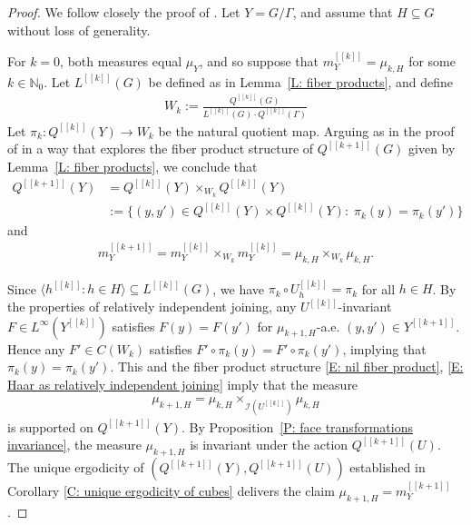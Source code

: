 \documentclass[11pt]{amsart}
\theoremstyle{definition}
\newcommand{\N}{{\mathbb N}}
\newcommand{\CI}{{\mathcal I}}
\newcommand{\cube}[1]{{[\![#1]\!]}}
\newcommand{\1}{{\mathbf{1}}}
\begin{document}
\begin{proof}
We follow closely the proof of \cite[Chapter 12, Proposition~7]{HK18}.
Let $Y=G/\Gamma$, and assume that $H\subseteq G$ without loss of generality.

    For $k=0$, both measures equal $\mu_Y$, and so suppose that $m_Y^\cube{k} = \mu_{k,H}$ for some $k\in\N_0$.
    Let $L^\cube{k}(G)$ be defined as in Lemma~\ref{L: fiber products}, and define
    \begin{align*}
        W_k := \frac{Q^\cube{k}(G)}{L^\cube{k}(G)\cdot Q^\cube{k}(\Gamma)}
    \end{align*}
        Let $\pi_k: Q^\cube{k}(Y)\to W_k$ be the natural quotient map. Arguing as in the proof of \cite[Chapter 12, Proposition~7]{HK18} in a way that explores the fiber product structure of $Q^\cube{k+1}(G)$ given by Lemma~\ref{L: fiber products}, we conclude that 
        \begin{align}\label{E: nil fiber product}
                    Q^\cube{k+1}(Y) &= Q^\cube{k}(Y)\times_{W_k}Q^\cube{k}(Y)\\
                    \nonumber
            &:=\{(y,y')\in Q^\cube{k}(Y)\times Q^\cube{k}(Y)\colon\; \pi_k(y)=\pi_k(y')\}
        \end{align}
        and
     \begin{align}\label{E: Haar as relatively independent joining}
        m^\cube{k+1}_Y = m^\cube{k}_Y \times_{W_k}m^\cube{k}_Y= \mu_{k,H} \times_{W_k}\mu_{k,H}.
    \end{align}


    Since $\langle h^{\cube{k}}\colon h\in H\rangle\subseteq L^\cube{k}(G)$, we have $\pi_k\circ U_h^{\cube{k}}=\pi_k$ for all $h\in H$. By the properties of relatively independent joining,
any $U^\cube{k}$-invariant $F\in L^\infty(Y^\cube{k})$ satisfies $F(y)=F(y')$ for $\mu_{k+1,H}$-a.e. $(y,y')\in Y^\cube{k+1}$. Hence any $F'\in C(W_k)$ satisfies $F'\circ \pi_k(y)=F'\circ\pi_k(y')$, implying that $\pi_k(y) = \pi_k(y')$. This and the fiber product structure \eqref{E: nil fiber product}, \eqref{E: Haar as relatively independent joining} imply that the measure
\begin{align*}
    \mu_{k+1,H} = \mu_{k,H}\times_{\CI(U^\cube{k})}\mu_{k,H}
\end{align*}
is supported on $Q^\cube{k+1}(Y)$. By Proposition~\ref{P: face transformations invariance}, the measure $\mu_{k+1,H}$ is invariant under the action $Q^\cube{k+1}(U)$. The unique ergodicity of $(Q^\cube{k+1}(Y),Q^\cube{k+1}(U))$ established in Corollary \ref{C: unique ergodicity of cubes} delivers the claim $\mu_{k+1,H} =  m_Y^\cube{k+1}$.
\end{proof}
\end{document}
